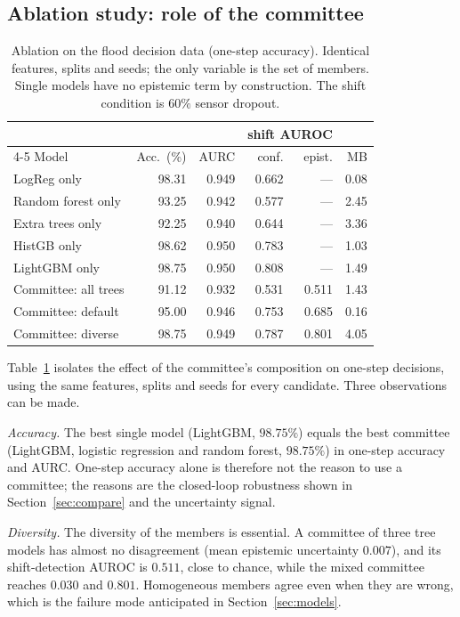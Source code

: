 \documentclass[journal]{IEEEtran}
\begin{document}
\subsection{Ablation study: role of the committee}\label{sec:ablation}
\begin{table}[t]
\centering
\caption{Ablation on the flood decision data (one-step accuracy). Identical
features, splits and seeds; the only variable is the set of members. Single
models have no epistemic term by construction. The shift condition is $60\%$
sensor dropout.}
\label{tab:ablation}
\footnotesize
\setlength{\tabcolsep}{3.5pt}
\begin{tabular}{lrrrrr}
\toprule
& & & \multicolumn{2}{c}{shift AUROC} & \\
\cmidrule(lr){4-5}
Model & Acc.\ (\%) & AURC & conf. & epist. & MB \\
\midrule
LogReg only& 98.31 & 0.949 & 0.662 & --- & 0.08 \\
Random forest only& 93.25 & 0.942 & 0.577 & --- & 2.45 \\
Extra trees only& 92.25 & 0.940 & 0.644 & --- & 3.36 \\
HistGB only& 98.62 & 0.950 & 0.783 & --- & 1.03 \\
LightGBM only& 98.75 & 0.950 & 0.808 & --- & 1.49 \\
Committee: all trees& 91.12 & 0.932 & 0.531 & 0.511 & 1.43 \\
Committee: default& 95.00 & 0.946 & 0.753 & 0.685 & 0.16 \\
Committee: diverse& 98.75 & 0.949 & 0.787 & 0.801 & 4.05 \\
\bottomrule
\end{tabular}
\end{table}

Table~\ref{tab:ablation} isolates the effect of the committee's composition on
one-step decisions, using the same features, splits and seeds for every
candidate. Three observations can be made.

\textit{Accuracy.} The best single model (LightGBM, $98.75\%$) equals the best
committee (LightGBM, logistic regression and random forest, $98.75\%$) in
one-step accuracy and AURC. One-step accuracy alone is therefore not the reason
to use a committee; the reasons are the closed-loop robustness shown in
Section~\ref{sec:compare} and the uncertainty signal.

\textit{Diversity.} The diversity of the members is essential. A committee of
three tree models has almost no disagreement (mean epistemic uncertainty
$0.007$), and its shift-detection AUROC is $0.511$, close to chance, while the
mixed committee reaches $0.030$ and $0.801$. Homogeneous members agree even when
they are wrong, which is the failure mode anticipated in
Section~\ref{sec:models}.
\end{document}

